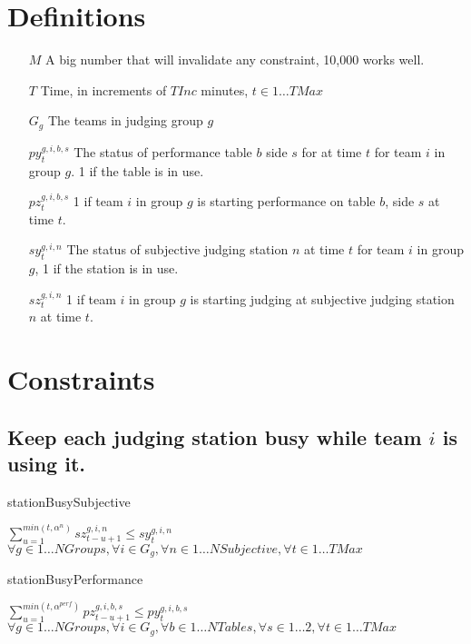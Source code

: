 \documentclass[letterpaper,11pt]{report}
\begin{document}
\section{Definitions}
\begin{itemize}

\item[$M$] A big number that will invalidate any constraint, 10,000 works well.

\item[$T$] Time, in increments of $TInc$ minutes, $t \in 1 \dots TMax$

\item[$G_{g}$] The teams in judging group $g$

\item[$py_{t}^{g,i,b,s}$] The status of performance table $b$ side $s$ for
at time $t$ for team $i$ in group $g$. 1 if the table is in use.  

\item[$pz_{t}^{g,i,b,s}$] 1 if team $i$ in group $g$ is starting performance on table $b$,
  side $s$ at time $t$.

\item[$sy_{t}^{g,i,n}$] The status of subjective judging station $n$ at time $t$ for team
  $i$ in group $g$, 1 if the station is in use.

\item[$sz_{t}^{g,i,n}$] 1 if team $i$ in group $g$ is starting judging at subjective
judging station $n$ at time $t$.


\end{itemize}


\section{Constraints}
 
\subsection{Keep each judging station busy while team $i$ is using it.}

\begin{algorithm}
\caption{stationBusySubjective}
$\sum\limits_{u=1}^{min(t, \alpha^{n})} sz_{t-u+1}^{g,i,n} \le sy_{t}^{g,i,n}$
\hfill $
\forall g \in 1 \dots NGroups,
\forall i \in G_{g},
\forall n \in 1 \dots NSubjective,
\forall t \in 1 \dots TMax
$
\end{algorithm}

\begin{algorithm}
\caption{stationBusyPerformance}
$\sum\limits_{u=1}^{min(t, \alpha^{perf})} pz_{t-u+1}^{g,i,b,s} \le py_{t}^{g,i,b,s}$
\hfill $
\forall g \in 1 \dots NGroups,
\forall i \in G_{g}, 
\forall b \in 1 \dots NTables,
\forall s \in 1 \dots 2,
\forall t \in 1 \dots TMax
$
\end{algorithm}
\end{document}
